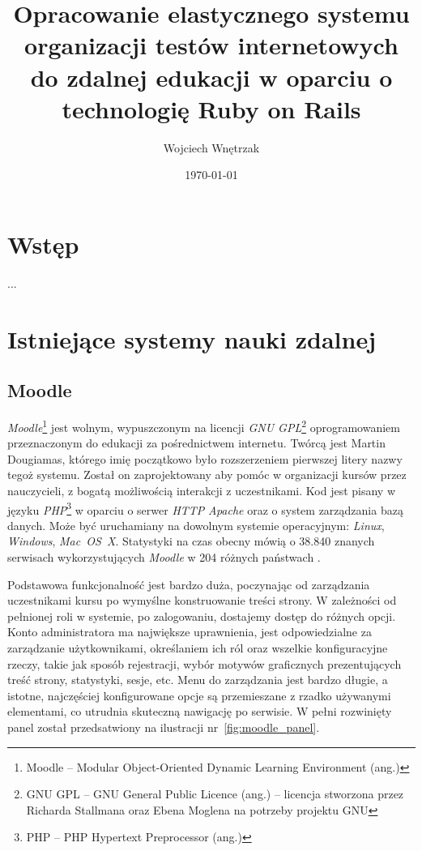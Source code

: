 \documentclass[a4paper,12pt]{article}
\begin{document}
\author{Wojciech Wnętrzak}
\title{Opracowanie elastycznego systemu organizacji testów internetowych do zdalnej
edukacji w oparciu o technologię Ruby on Rails}
\date{\today}

\begin{titlepage}
\maketitle
\end{titlepage}

\tableofcontents

\clearpage
\section{Wstęp}
...

\section{Istniejące systemy nauki zdalnej}
\subsection{Moodle}
\emph{Moodle}\footnote{Moodle -- Modular Object-Oriented Dynamic Learning Environment (ang.)}
jest wolnym, wypuszczonym na licencji \emph{GNU GPL}\footnote{GNU GPL -- GNU General Public
Licence (ang.) -- licencja stworzona przez Richarda Stallmana oraz Ebena Moglena na potrzeby
projektu GNU} oprogramowaniem przeznaczonym do edukacji za pośrednictwem internetu. Twórcą
jest Martin Dougiamas, którego imię początkowo było rozszerzeniem pierwszej litery nazwy
tegoż systemu. Został on zaprojektowany aby pomóc w organizacji kursów przez nauczycieli,
z bogatą możliwością interakcji z uczestnikami. Kod jest pisany w języku
\emph{PHP}\footnote{PHP -- PHP Hypertext Preprocessor (ang.)} w oparciu o serwer \emph{HTTP}
\emph{Apache} oraz o system zarządzania bazą danych. Może być uruchamiany na dowolnym
systemie operacyjnym: \emph{Linux}, \emph{Windows}, \emph{Mac~OS~X}. Statystyki na czas
obecny mówią o 38.840 znanych serwisach wykorzystujących \emph{Moodle} w 204 różnych
państwach \cite{moodle-statistics}.


Podstawowa funkcjonalność jest bardzo duża, poczynając od zarządzania uczestnikami kursu
po wymyślne konstruowanie treści strony. W zależności od pełnionej roli w systemie, po
zalogowaniu, dostajemy dostęp do różnych opcji. Konto administratora ma największe
uprawnienia, jest odpowiedzialne za zarządzanie użytkownikami, określaniem ich ról oraz
wszelkie konfiguracyjne rzeczy, takie jak sposób rejestracji, wybór motywów graficznych
prezentujących treść strony, statystyki, sesje, etc.
Menu do zarządzania jest bardzo długie, a istotne, najczęściej konfigurowane opcje są
przemieszane z rzadko używanymi elementami, co utrudnia skuteczną nawigację po serwisie.
W pełni rozwinięty panel został przedsatwiony na ilustracji nr~\ref{fig:moodle_panel}.
\end{document}
